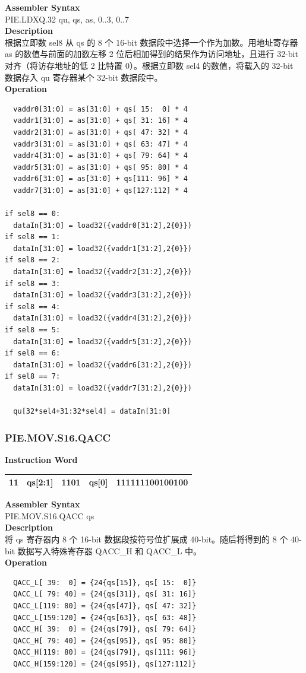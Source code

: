 \textbf{Assembler Syntax} \\
PIE.LDXQ.32 qu, qs, as, 0..3, 0..7 \\
\textbf{Description} \\
根据立即数 sel8 从 qs 的 8 个 16-bit 数据段中选择一个作为加数。用地址寄存器 as 的数值与前面的加数左移 2 位后相加得到的结果作为访问地址，且进行 32-bit 对齐（将访存地址的低 2 比特置 0）。根据立即数 sel4 的数值，将载入的 32-bit 数据存入 qu 寄存器某个 32-bit 数据段中。\\
\textbf{Operation}
\begin{lstlisting}
  vaddr0[31:0] = as[31:0] + qs[ 15:  0] * 4
  vaddr1[31:0] = as[31:0] + qs[ 31: 16] * 4
  vaddr2[31:0] = as[31:0] + qs[ 47: 32] * 4
  vaddr3[31:0] = as[31:0] + qs[ 63: 47] * 4
  vaddr4[31:0] = as[31:0] + qs[ 79: 64] * 4
  vaddr5[31:0] = as[31:0] + qs[ 95: 80] * 4
  vaddr6[31:0] = as[31:0] + qs[111: 96] * 4
  vaddr7[31:0] = as[31:0] + qs[127:112] * 4

if sel8 == 0:
  dataIn[31:0] = load32({vaddr0[31:2],2{0}})
if sel8 == 1:
  dataIn[31:0] = load32({vaddr1[31:2],2{0}})
if sel8 == 2:
  dataIn[31:0] = load32({vaddr2[31:2],2{0}})
if sel8 == 3:
  dataIn[31:0] = load32({vaddr3[31:2],2{0}})
if sel8 == 4:
  dataIn[31:0] = load32({vaddr4[31:2],2{0}})
if sel8 == 5:
  dataIn[31:0] = load32({vaddr5[31:2],2{0}})
if sel8 == 6:
  dataIn[31:0] = load32({vaddr6[31:2],2{0}})
if sel8 == 7:
  dataIn[31:0] = load32({vaddr7[31:2],2{0}})

  qu[32*sel4+31:32*sel4] = dataIn[31:0]
\end{lstlisting}

\newpage
\subsubsection{PIE.MOV.S16.QACC}\label{instruction:PIEMOVS16QACC}
\setlength\tabcolsep{6pt}
\textbf{Instruction Word} \\
\begin{tabular}{|c|c|c|c|c|}
	\hline
	11 & qs[2:1] & 1101 & qs[0] & 111111100100100 \\
	\hline
\end{tabular}

\textbf{Assembler Syntax} \\
PIE.MOV.S16.QACC qs \\
\textbf{Description} \\
将 qs 寄存器内 8 个 16-bit 数据段按符号位扩展成 40-bit。随后将得到的 8 个 40-bit 数据写入特殊寄存器 QACC\_H 和 QACC\_L 中。\\
\textbf{Operation}
\begin{lstlisting}
  QACC_L[ 39:  0] = {24{qs[15]}, qs[ 15:  0]}
  QACC_L[ 79: 40] = {24{qs[31]}, qs[ 31: 16]}
  QACC_L[119: 80] = {24{qs[47]}, qs[ 47: 32]}
  QACC_L[159:120] = {24{qs[63]}, qs[ 63: 48]}
  QACC_H[ 39:  0] = {24{qs[79]}, qs[ 79: 64]}
  QACC_H[ 79: 40] = {24{qs[95]}, qs[ 95: 80]}
  QACC_H[119: 80] = {24{qs[79]}, qs[111: 96]}
  QACC_H[159:120] = {24{qs[95]}, qs[127:112]}
\end{lstlisting}

